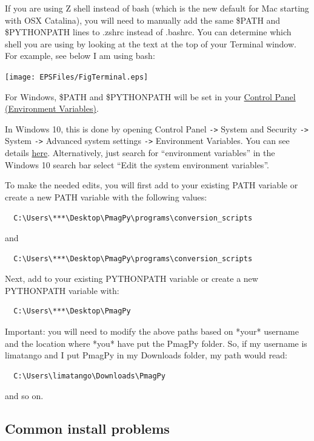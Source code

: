 \documentclass[11pt]{book}
\begin{document}
{If you are using Z shell instead of bash (which is the new default for Mac starting with OSX Catalina), you will need to manually add the same \$PATH and \$PYTHONPATH lines to .zshrc instead of .bashrc.  You can determine which shell you are using by looking at the text at the top of your Terminal window.  For example, see below I am using bash:

\texttt{[image: EPSFiles/FigTerminal.eps]}

For Windows, \$PATH and \$PYTHONPATH will be set in your \href{https://www.java.com/en/download/help/path.xml}{Control Panel (Environment Variables)}.

In Windows 10, this is done by opening Control Panel \verb|->| System and Security \verb|->| System \verb|->| Advanced system settings \verb|->| Environment Variables.  You can see details \href{https://www.java.com/en/download/help/path.xml}{here}.  Alternatively, just search for “environment variables” in the Windows 10 search bar select ``Edit the system environment variables''.

To make the needed edits, you will first add to your existing PATH variable or create a new PATH variable with the following values: \begin{verbatim}
  C:\Users\***\Desktop\PmagPy\programs\conversion_scripts
\end{verbatim}
and \begin{verbatim}
  C:\Users\***\Desktop\PmagPy\programs\conversion_scripts
\end{verbatim}
Next, add to your existing PYTHONPATH variable or create a new PYTHONPATH variable with: \begin{verbatim}
  C:\Users\***\Desktop\PmagPy
\end{verbatim}

Important: you will need to modify the above paths based on *your* username and the location where *you* have put the PmagPy folder.  So, if my username is limatango and I put PmagPy in my Downloads folder, my path would read: \begin{verbatim}
  C:\Users\limatango\Downloads\PmagPy
\end{verbatim}
and so on.

\subsection{Common install problems}

\begin{itemize}


\end{itemize}}
\end{document}
